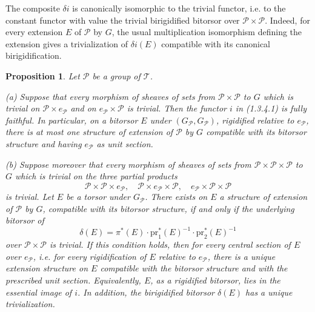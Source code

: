 \documentclass[11pt]{article}
\theoremstyle{plain}
\newtheorem{proposition}[theorem]{Proposition}
\theoremstyle{definition}
\theoremstyle{remark}
\begin{document}
The composite $\delta i$ is canonically isomorphic to the trivial functor, i.e. to the constant functor with value the trivial birigidified bitorsor over $\mathcal P\times\mathcal P$. Indeed, for every extension $E$ of $\mathcal P$ by $G$, the usual multiplication isomorphism defining the extension gives a trivialization of $\delta i(E)$ compatible with its canonical birigidification.

\begin{proposition}
Let $\mathcal P$ be a group of $\mathcal T$.

\textup{(a)} Suppose that every morphism of sheaves of sets from $\mathcal P\times\mathcal P$ to $G$ which is trivial on $\mathcal P\times e_{\mathcal P}$ and on $e_{\mathcal P}\times\mathcal P$ is trivial. Then the functor $i$ in \textup{(1.3.4.1)} is fully faithful. In particular, on a bitorsor $E$ under $(G_{\mathcal P},G_{\mathcal P})$, rigidified relative to $e_{\mathcal P}$, there is at most one structure of extension of $\mathcal P$ by $G$ compatible with its bitorsor structure and having $e_{\mathcal P}$ as unit section.

\textup{(b)} Suppose moreover that every morphism of sheaves of sets from $\mathcal P\times\mathcal P\times\mathcal P$ to $G$ which is trivial on the three partial products
\[
\mathcal P\times\mathcal P\times e_{\mathcal P},\quad
\mathcal P\times e_{\mathcal P}\times\mathcal P,\quad
 e_{\mathcal P}\times\mathcal P\times\mathcal P
\]
is trivial. Let $E$ be a torsor under $G_{\mathcal P}$. There exists on $E$ a structure of extension of $\mathcal P$ by $G$, compatible with its bitorsor structure, if and only if the underlying bitorsor of
\[
\delta(E)=\pi^*(E)\cdot \mathrm{pr}_1^*(E)^{-1}\cdot\mathrm{pr}_2^*(E)^{-1}
\]
over $\mathcal P\times\mathcal P$ is trivial. If this condition holds, then for every central section of $E$ over $e_{\mathcal P}$, i.e. for every rigidification of $E$ relative to $e_{\mathcal P}$, there is a unique extension structure on $E$ compatible with the bitorsor structure and with the prescribed unit section. Equivalently, $E$, as a rigidified bitorsor, lies in the essential image of $i$. In addition, the birigidified bitorsor $\delta(E)$ has a unique trivialization.
\end{proposition}
\end{document}
